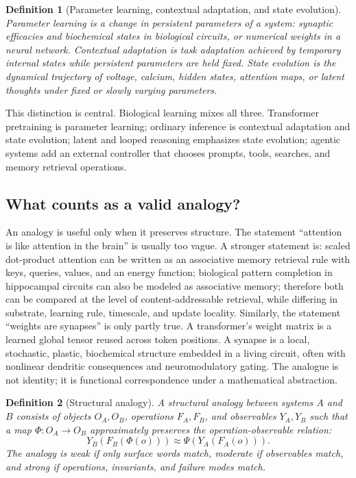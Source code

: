 \documentclass[11pt]{article}
\newtheorem{definition}{Definition}[section]
\newcommand{\1}{\mathbf{1}}
\begin{document}
\begin{definition}[Parameter learning, contextual adaptation, and state evolution]
\emph{Parameter learning} is a change in persistent parameters of a system: synaptic efficacies and biochemical states in biological circuits, or numerical weights in a neural network. \emph{Contextual adaptation} is task adaptation achieved by temporary internal states while persistent parameters are held fixed. \emph{State evolution} is the dynamical trajectory of voltage, calcium, hidden states, attention maps, or latent thoughts under fixed or slowly varying parameters.
\end{definition}

This distinction is central. Biological learning mixes all three. Transformer pretraining is parameter learning; ordinary inference is contextual adaptation and state evolution; latent and looped reasoning emphasizes state evolution; agentic systems add an external controller that chooses prompts, tools, searches, and memory retrieval operations.

\subsection{What counts as a valid analogy?}

An analogy is useful only when it preserves structure. The statement ``attention is like attention in the brain'' is usually too vague. A stronger statement is: scaled dot-product attention can be written as an associative memory retrieval rule with keys, queries, values, and an energy function; biological pattern completion in hippocampal circuits can also be modeled as associative memory; therefore both can be compared at the level of content-addressable retrieval, while differing in substrate, learning rule, timescale, and update locality. Similarly, the statement ``weights are synapses'' is only partly true. A transformer's weight matrix is a learned global tensor reused across token positions. A synapse is a local, stochastic, plastic, biochemical structure embedded in a living circuit, often with nonlinear dendritic consequences and neuromodulatory gating. The analogue is not identity; it is functional correspondence under a mathematical abstraction.

\begin{definition}[Structural analogy]
A structural analogy between systems $A$ and $B$ consists of objects $O_A,O_B$, operations $F_A,F_B$, and observables $Y_A,Y_B$ such that a map $\Phi:O_A\to O_B$ approximately preserves the operation-observable relation:
\[
Y_B(F_B(\Phi(o))) \approx \Psi(Y_A(F_A(o))).
\]
The analogy is weak if only surface words match, moderate if observables match, and strong if operations, invariants, and failure modes match.
\end{definition}
\end{document}
